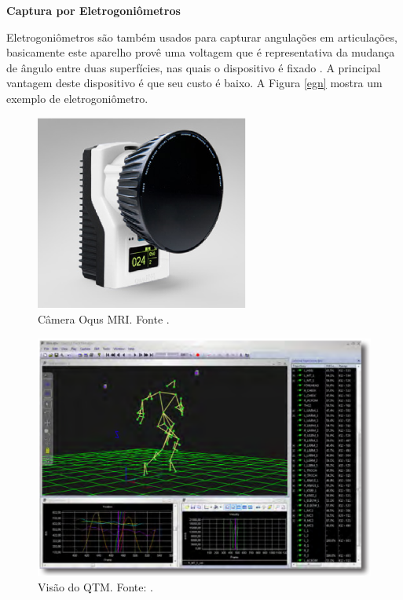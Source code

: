 \textbf{Captura por Eletrogoniômetros}

Eletrogoniômetros são também usados para capturar angulações em articulações, basicamente este aparelho provê uma voltagem que é representativa da mudança de ângulo entre duas superfícies, nas quais o dispositivo é fixado \cite{K.Ibrahim2012}. 
A principal vantagem deste dispositivo é que seu custo é baixo. A Figura \ref{egn} mostra um exemplo de eletrogoniômetro.

\begin{figure}[ht]
	\centering
	\includegraphics[width=7cm]{figuras/oqus-mri.eps}
	\caption{Câmera Oqus MRI. Fonte \cite{Qualisys2013}.
}
	\label{oqus_mri}
\end{figure}


\begin{figure}[ht]
	\centering
	\includegraphics[width=15cm]{figuras/qtm.eps}
	\caption{Visão do QTM. Fonte: \cite{Qualisys2010}.}
	\label{visao_qtm}
	
\end{figure}


